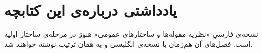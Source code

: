 \chapter*{یادداشتی درباره‌ی این کتابچه}

نسخه‌ی فارسیِ «نظریه مقوله‌ها و ساختارهای عمومی» هنوز در مرحله‌ی ساختار اولیه است. فصل‌های آن هم‌زمان با نسخه‌ی انگلیسی و به همان ترتیب نوشته خواهند شد.
